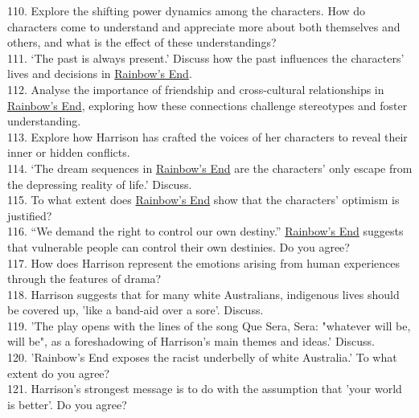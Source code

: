 \documentclass[a4paper]{article}
\begin{document}
110. Explore the shifting power dynamics among the characters. How do characters come to understand and appreciate more about both themselves and others, and what is the effect of these understandings?\\

111. ‘The past is always present.’ Discuss how the past influences the characters’ lives and decisions in \underline{Rainbow’s End}.\\

112. Analyse the importance of friendship and cross-cultural relationships in \underline{Rainbow’s End}, exploring how these connections challenge stereotypes and foster understanding.\\

113. Explore how Harrison has crafted the voices of her characters to reveal their inner or hidden conflicts.\\

114. ‘The dream sequences in \underline{Rainbow’s End} are the characters’ only escape from the depressing reality of life.’ Discuss.\\

115. To what extent does \underline{Rainbow’s End} show that the characters’ optimism is justified?\\

116. “We demand the right to control our own destiny.” \underline{Rainbow’s End} suggests that vulnerable people can control their own destinies. Do you agree?\\

117. How does Harrison represent the emotions arising from human experiences through the features of drama?\\




118. Harrison suggests that for many white Australians, indigenous lives should be covered up, 'like a band-aid over a sore'. Discuss.\\

119. 'The play opens with the lines of the song Que Sera, Sera: "whatever will be, will be", as a foreshadowing of Harrison's main themes and ideas.' Discuss.\\

120. 'Rainbow's End exposes the racist underbelly of white Australia.' To what extent do you agree?\\

121. Harrison's strongest message is to do with the assumption that 'your world is better'. Do you agree?\\
\end{document}
